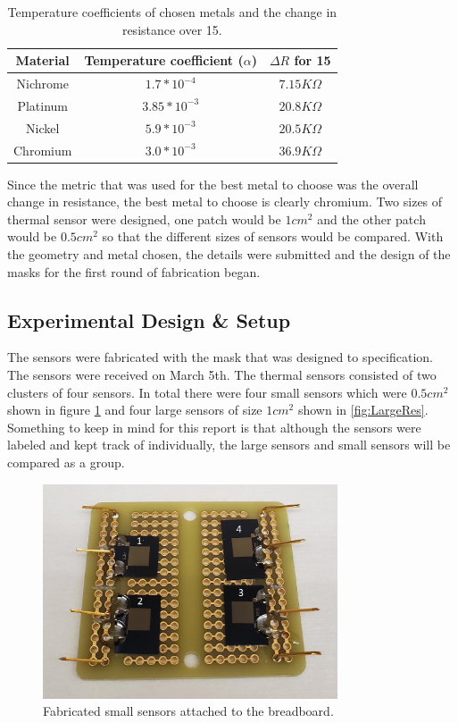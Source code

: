 \documentclass[12pt,a4paper]{report}
\begin{document}
\begin{table}[h!]
    \centering
    \caption{Temperature coefficients of chosen metals and the change in resistance over 15\textcelsius{}.}
    \label{tab:tempcoefficienttable}
    \begin{tabular}{|c|c|c|}
        \hline
        Material & Temperature coefficient ($\alpha$) & $\Delta R$ for 15\textcelsius{} \\
        \hline
        Nichrome & $1.7*10^{-4}$ & $7.15K\Omega$ \\
        \hline
        Platinum & $3.85*10^{-3}$ & $20.8K\Omega$ \\
        \hline
        Nickel & $5.9*10^{-3}$ & $20.5K\Omega$ \\
        \hline
        Chromium & $3.0*10^{-3}$ & $36.9K\Omega$ \\
        \hline
    \end{tabular}
\end{table}

Since the metric that was used for the best metal to choose was the overall change in resistance, the best metal to choose is clearly chromium. Two sizes of thermal sensor were designed, one patch would be $1cm^2$ and the other patch would be $0.5cm^2$ so that the different sizes of sensors would be compared. With the geometry and metal chosen, the details were submitted and the design of the masks for the first round of fabrication began.


\subsection{Experimental Design \& Setup}

The sensors were fabricated with the mask that was designed to specification. The sensors were received on March 5th. The thermal sensors consisted of two clusters of four sensors. In total there were four small sensors which were $0.5cm^2$ shown in figure \ref{fig:SmallRes} and four large sensors of size $1cm^2$ shown in \ref{fig:LargeRes}. Something to keep in mind for this report is that although the sensors were labeled and kept track of individually, the large sensors and small sensors will be compared as a group.

\begin{figure}[h!]
    \centering
    \includegraphics[height = 2.5in]{Images/SMALLRES.png}
    \caption{Fabricated small sensors attached to the breadboard.}
    \label{fig:SmallRes}
\end{figure}
\end{document}
